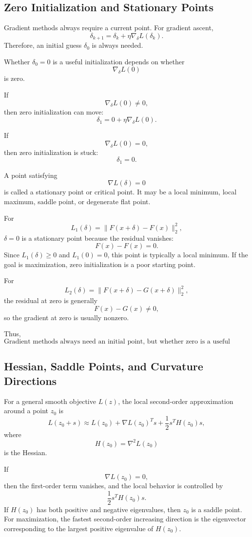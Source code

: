 \documentclass{article}
\begin{document}
\subsection{Zero Initialization and Stationary Points}

Gradient methods always require a current point. For gradient ascent,
\[
\delta_{k+1}
=
\delta_k+\eta \nabla_\delta L(\delta_k).
\]
Therefore, an initial guess \(\delta_0\) is always needed.

Whether \(\delta_0=0\) is a useful initialization depends on whether
\[
\nabla_\delta L(0)
\]
is zero.

If
\[
\nabla_\delta L(0)\neq 0,
\]
then zero initialization can move:
\[
\delta_1
=
0+\eta\nabla_\delta L(0).
\]

If
\[
\nabla_\delta L(0)=0,
\]
then zero initialization is stuck:
\[
\delta_1=0.
\]

A point satisfying
\[
\nabla L(\delta)=0
\]
is called a stationary point or critical point. It may be a local minimum, local maximum, saddle point, or degenerate flat point.

For
\[
L_1(\delta)=\|F(x+\delta)-F(x)\|_2^2,
\]
\(\delta=0\) is a stationary point because the residual vanishes:
\[
F(x)-F(x)=0.
\]
Since \(L_1(\delta)\geq 0\) and \(L_1(0)=0\), this point is typically a local minimum. If the goal is maximization, zero initialization is a poor starting point.

For
\[
L_2(\delta)=\|F(x+\delta)-G(x+\delta)\|_2^2,
\]
the residual at zero is generally
\[
F(x)-G(x)\neq 0,
\]
so the gradient at zero is usually nonzero.

Thus,
\[
\boxed{
\text{Gradient methods always need an initial point, but whether zero is a useful initial point depends on the objective.}
}
\]

\subsection{Hessian, Saddle Points, and Curvature Directions}

For a general smooth objective \(L(z)\), the local second-order approximation around a point \(z_0\) is
\[
L(z_0+s)
\approx
L(z_0)
+
\nabla L(z_0)^T s
+
\frac12 s^T H(z_0)s,
\]
where
\[
H(z_0)=\nabla^2 L(z_0)
\]
is the Hessian.

If
\[
\nabla L(z_0)=0,
\]
then the first-order term vanishes, and the local behavior is controlled by
\[
\frac12 s^TH(z_0)s.
\]
If \(H(z_0)\) has both positive and negative eigenvalues, then \(z_0\) is a saddle point. For maximization, the fastest second-order increasing direction is the eigenvector corresponding to the largest positive eigenvalue of \(H(z_0)\).
\end{document}
